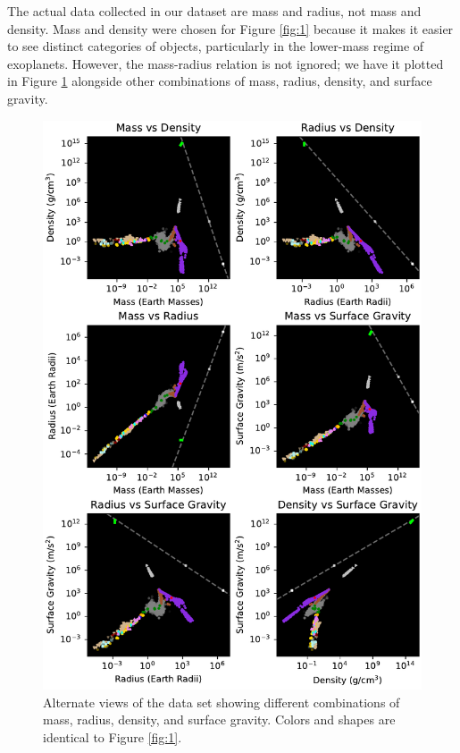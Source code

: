 \documentclass[twocolumn,linenumbers]{aastex631}
\begin{document}
The actual data collected in our dataset are mass and radius, not mass and density. Mass and density were chosen for Figure \ref{fig:1} because it makes it easier to see distinct categories of objects, particularly in the lower-mass regime of exoplanets. However, the mass-radius relation is not ignored; we have it plotted in Figure \ref{fig:3} alongside other combinations of mass, radius, density, and surface gravity. 

\begin{figure}[htbp]
\centering
\includegraphics[scale = 1]{AltVariableViews.pdf}
\centering
\caption{Alternate views of the data set showing different combinations of mass, radius, density, and surface gravity. Colors and shapes are identical to Figure \ref{fig:1}.}
\label{fig:3}
\end{figure}
\end{document}
